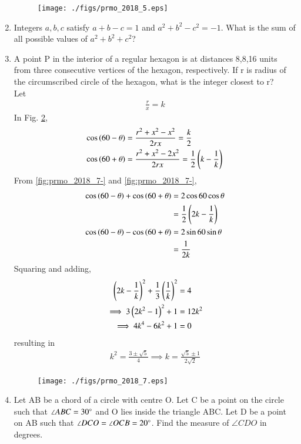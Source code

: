 \documentclass[journal,12pt,twocolumn]{IEEEtran}
\renewcommand\thesection{\arabic{section}}
\begin{document}
\begin{enumerate}[label=\thesection.\arabic*,ref=\thesection.\theenumi]
\begin{figure}[!ht]
\centering
\texttt{[image: ./figs/prmo\_2018\_5.eps]}
\caption{}
\label{fig:prmo_2018_5}
\end{figure}
\item  Integers $a, b, c$ satisfy $a + b - c =1$ and $a^2 + b^2 - c^2 =-1$. What is the sum of all possible values of $a^2 + b^2 + c^2$?

\item A point P in the interior of a regular hexagon is at distances 8,8,16 units from three consecutive vertices of the hexagon, respectively. If r is radius of the circumscribed circle of the hexagon, what is the integer closest to r? 
\\
\solution Let
\begin{align}
\frac{r}{x} = k
\end{align}
In Fig. \ref{fig:prmo_2018_7},
\begin{align}
\label{fig:prmo_2018_7-}
\cos\brak{60-\theta} &= \frac{r^2+x^2-x^2}{2rx} = \frac{k}{2}
\\
\cos\brak{60+\theta} &= \frac{r^2+x^2-2x^2}{2rx} = \frac{1}{2}\brak{k - \frac{1}{k}}
\label{fig:prmo_2018_7+}
\end{align}
%
From \eqref{fig:prmo_2018_7-} and \eqref{fig:prmo_2018_7-},
\begin{align}
\label{fig:prmo_2018_7cos+}
\cos\brak{60-\theta} + \cos\brak{60+\theta}&=  2\cos60\cos\theta 
\nonumber \\
&=\frac{1}{2}\brak{2k - \frac{1}{k}}
\\
\cos\brak{60-\theta} - \cos\brak{60+\theta}&=   2\sin60\sin\theta
\nonumber \\
&=\frac{1}{2k}
\label{fig:prmo_2018_7cos-}
\end{align}
%
Squaring and adding, 
\begin{align}
\left(2k - \frac{1}{k}\right)^2+\frac{1}{3}\left(\frac{1}{k}\right)^2 &= 4
\\
\implies 3\left(2k^2 - 1\right)^2+1 &= 12k^2
\\
\implies 4k^4 -6k^2+1&= 0
\end{align}
resulting in 
\begin{align}
k^2 = \frac{3\pm \sqrt{5}}{4}\implies k =\frac{\sqrt{5}\pm 1}{2\sqrt{2}}
\end{align}
\begin{figure}[!ht]
\centering
\texttt{[image: ./figs/prmo\_2018\_7.eps]}
\caption{}
\label{fig:prmo_2018_7}
\end{figure}
\item  Let AB be a chord of a circle with centre O. Let C be a point on the circle such that $\angle ABC = 30\degree$  and O lies inside the triangle ABC. Let D be a point on AB such that $\angle DCO = \angle OCB = 20\degree$. Find the measure of $\angle CDO$ in degrees. 

\end{enumerate}
\end{document}
